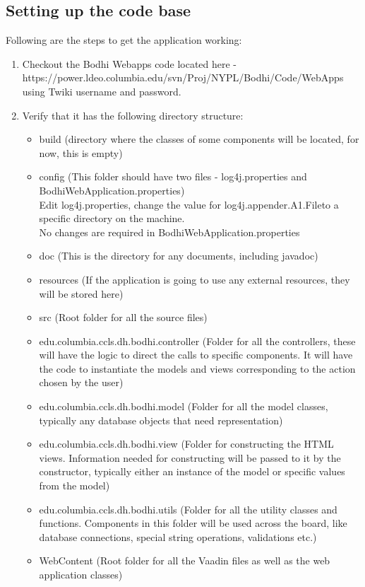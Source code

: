 \documentclass[amsart, 12pt]{article}
\begin{document}
\subsection{Setting up the code base}
Following are the steps to get the application working:
\begin{enumerate}
\item Checkout the Bodhi Webapps code located here -\\ https://power.ldeo.columbia.edu/svn/Proj/NYPL/Bodhi/Code/WebApps using Twiki username and password.

\item Verify that it has the following directory structure:
\begin{itemize}
    \item build (directory where the classes of some components will be located, for now, this is empty)
\item config (This folder should have two files - log4j.properties and BodhiWebApplication.properties)\\
Edit log4j.properties, change the value for \textasciigrave log4j.appender.A1.File\textasciiacute to a specific directory on the machine.\\
No changes are required in BodhiWebApplication.properties
\item doc (This is the directory for any documents, including javadoc)
\item resources (If the application is going to use any external resources, they will be stored here)
\item src (Root folder for all the source files)
\item edu.columbia.ccls.dh.bodhi.controller (Folder for all the controllers, these will have the logic to direct the calls to specific components. It will have the code to instantiate the models and views corresponding to the action chosen by the user)
\item edu.columbia.ccls.dh.bodhi.model (Folder for all the model classes, typically any database objects that need representation)
\item edu.columbia.ccls.dh.bodhi.view (Folder for constructing the HTML views. Information needed for constructing will be passed to it by the constructor, typically either an instance of the model or specific values from the model)
\item edu.columbia.ccls.dh.bodhi.utils (Folder for all the utility classes and functions. Components in this folder will be used across the board, like database connections, special string operations, validations etc.)
\item WebContent (Root folder for all the Vaadin files as well as the web application classes)
\end{itemize}


\end{enumerate}
\end{document}
